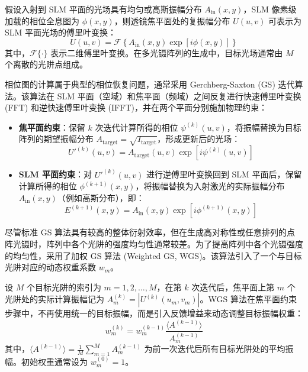 \documentclass[../main.tex]{subfiles}
\begin{document}
假设入射到 SLM 平面的光场具有均匀或高斯振幅分布 $A_{\text{in}}(x,y)$，SLM 像素级加载的相位全息图为 $\phi(x,y)$，则透镜焦平面处的复振幅分布 $U(u,v)$ 可表示为 SLM 平面光场的傅里叶变换：
\begin{equation}
    U(u,v) = \mathcal{F} \left\{ A_{\text{in}}(x,y) \exp[i\phi(x,y)] \right\}
\end{equation}
其中，$\mathcal{F}\{\cdot\}$ 表示二维傅里叶变换。在多光镊阵列的生成中，目标光场通常由 $M$ 个离散的光阱点组成。

相位图的计算属于典型的相位恢复问题，通常采用 Gerchberg-Saxton (GS) 迭代算法。该算法在 SLM 平面（空域）和焦平面（频域）之间反复进行快速傅里叶变换 (FFT) 和逆快速傅里叶变换 (IFFT)，并在两个平面分别施加物理约束：
\begin{itemize}
    \item \textbf{焦平面约束}：保留 $k$ 次迭代计算所得的相位 $\psi^{(k)}(u,v)$，将振幅替换为目标阵列的期望振幅分布 $A_{\text{target}} = \sqrt{I_{\text{target}}}$，形成更新后的光场：
    \begin{equation}
        U'^{(k)}(u,v) = A_{\text{target}}(u,v) \exp\left[ i\psi^{(k)}(u,v) \right]
    \end{equation}
    \item \textbf{SLM 平面约束}：对 $U'^{(k)}(u,v)$ 进行逆傅里叶变换回到 SLM 平面后，保留计算所得的相位 $\phi^{(k+1)}(x,y)$，将振幅替换为入射激光的实际振幅分布 $A_{\text{in}}(x,y)$（例如高斯分布），即：
    \begin{equation}
        E^{(k+1)}(x,y) = A_{\text{in}}(x,y) \exp\left[ i\phi^{(k+1)}(x,y) \right]
    \end{equation}
\end{itemize}

尽管标准 GS 算法具有较高的整体衍射效率，但在生成高对称性或任意排列的点阵光镊时，阵列中各个光阱的强度均匀性通常较差。为了提高阵列中各个光镊强度的均匀性，采用了加权 GS 算法 (Weighted GS, WGS)。该算法引入了一个与目标光阱对应的动态权重系数 $w_m$。

设 $M$ 个目标光阱的索引为 $m = 1, 2, \dots, M$，在第 $k$ 次迭代后，焦平面上第 $m$ 个光阱处的实际计算振幅记为 $A_m^{(k)} = |U^{(k)}(u_m, v_m)|$。WGS 算法在焦平面约束步骤中，不再使用统一的目标振幅，而是引入反馈增益来动态调整目标振幅权重：
\begin{equation}
    w_m^{(k)} = w_m^{(k-1)} \frac{\langle A^{(k-1)} \rangle}{A_m^{(k-1)}}
\end{equation}
其中，$\langle A^{(k-1)} \rangle = \frac{1}{M}\sum_{m=1}^M A_m^{(k-1)}$ 为前一次迭代后所有目标光阱处的平均振幅。初始权重通常设为 $w_m^{(0)} = 1$。
\end{document}
